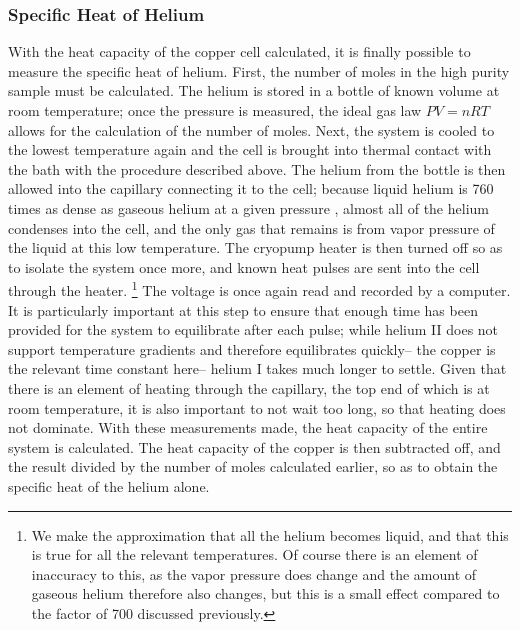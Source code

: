 \subsubsection{Specific Heat of Helium}
With the heat capacity of the copper cell calculated, it is finally possible to measure the specific heat of helium. First, the number of moles in the high purity sample must be calculated. The helium is stored in a bottle of known volume at room temperature; once the pressure is measured, the ideal gas law $P V = n R T$ allows for the calculation of the number of moles. Next, the system is cooled to the lowest temperature again and the cell is brought into thermal contact with the bath with the procedure described above. The helium from the bottle is then allowed into the capillary connecting it to the cell; because liquid helium is 760 times as dense as gaseous helium at a given pressure \cite{shi}, almost all of the helium condenses into the cell, and the only gas that remains is from vapor pressure of the liquid at this low temperature. The cryopump heater is then turned off so as to isolate the system once more, and known heat pulses are sent into the cell through the heater. \footnote{We make the approximation that all the helium becomes liquid, and that this is true for all the relevant temperatures. Of course there is an element of inaccuracy to this, as the vapor pressure does change and the amount of gaseous helium therefore also changes, but this is a small effect compared to the factor of 700 discussed previously.} The voltage is once again read and recorded by a computer. It is particularly important at this step to ensure that enough time has been provided for the system to equilibrate after each pulse; while helium II does not support temperature gradients and therefore equilibrates quickly-- the copper is the relevant time constant here-- helium I takes much longer to settle. Given that there is an element of heating through the capillary, the top end of which is at room temperature, it is also important to not wait too long, so that heating does not dominate.  With these measurements made, the heat capacity of the entire system is calculated. The heat capacity of the copper is then subtracted off, and the result divided by the number of moles calculated earlier, so as to obtain the specific heat of the helium alone.